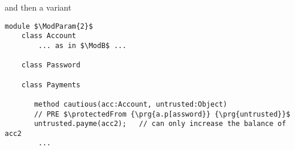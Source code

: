%
% 
 
 and then a variant
 
 \begin{lstlisting}[mathescape=true, language=chainmail, frame=lines]
module $\ModParam{2}$
    class Account 
        ... as in $\ModB$ ...
        
    class Password
    
    class Payments
          
       method cautious(acc:Account, untrusted:Object)
       // PRE $\protectedFrom {\prg{a.p[assword}} {\prg{untrusted}}$
       untrusted.payme(acc2);   // can only increase the balance of acc2
        ...
\end{lstlisting}

